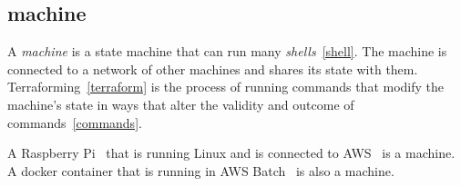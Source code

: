 \subsection{machine}
\label{machine}

A \emph{machine} is a state machine that can run many \emph{shells}~\ref{shell}. The machine is connected to a network of other machines and shares its state with them. Terraforming~\ref{terraform} is the process of running commands that modify the machine's state in ways that alter the validity and outcome of commands~\ref{commands}.

A Raspberry Pi~\cite{RaspberryPi} that is running Linux and is connected to AWS~\cite{AWS} is a machine. A docker container that is running in AWS Batch~\cite{AWSBatch} is also a machine.